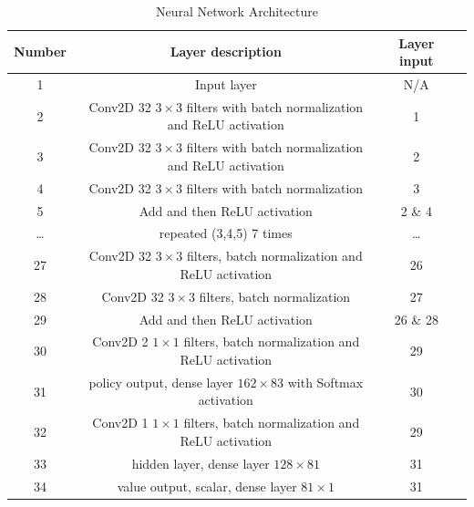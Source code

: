 \documentclass{article}
\begin{document}
\begin{table}[ht]
  \caption{Neural Network Architecture}
  \label{tbl:nna}
  \centering
  \begin{tabular}{c | c | c | c}
    Number & Layer description    & Layer input \\
    \hline
    1 & Input layer                                           & N/A \\                      
    2 & Conv2D 32 $3 \times 3$ filters with batch normalization and ReLU activation & 1\\
    3 & Conv2D 32 $3 \times 3$ filters with batch normalization and ReLU activation & 2\\
    4 & Conv2D 32 $3 \times 3$ filters with batch normalization                     & 3 \\
    5 & Add and then ReLU activation                                               & 2 \& 4 \\
    \ldots & repeated (3,4,5) 7 times & \ldots    \\
    27 & Conv2D 32 $3 \times 3$ filters, batch normalization and ReLU activation & 26 \\
    28 & Conv2D 32 $3 \times 3$ filters, batch normalization                     & 27 \\
    29 & Add and then ReLU activation                                               & 26 \& 28 \\
    \hline
    30 & Conv2D 2 $1 \times 1$ filters, batch normalization and ReLU activation & 29 \\
    31 & policy output, dense layer $162 \times 83$ with Softmax activation & 30 \\
    \hline
    32 & Conv2D 1 $1 \times 1$ filters, batch normalization and ReLU activation & 29 \\
    33 & hidden layer, dense layer $128 \times 81$ & 31 \\
    34 & value output, scalar, dense layer $81 \times 1$ & 31 \\
    \hline
  \end{tabular}
\end{table}
\end{document}

